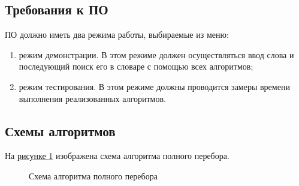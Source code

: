 \documentclass{article}
\begin{document}
		\subsection{Требования к ПО} 
		ПО должно иметь два режима работы, выбираемые из меню:
		\begin{enumerate}
			\item режим демонстрации. В этом режиме должен осуществляться ввод слова и последующий поиск его в словаре с помощью всех алгоритмов;
		 	\item режим тестирования. В этом режиме должны проводится замеры времени выполнения реализованных алгоритмов.
	 	\end{enumerate}
		\subsection{Схемы алгоритмов}
		На \hyperref[bruteForceAlg]{рисунке \ref{bruteForceAlg}} изображена схема алгоритма полного перебора.
	\begin{figure}[h!]
		\caption{Схема алгоритма полного перебора}
		\label{bruteForceAlg}
	\end{figure}
	\newpage
\end{document}
